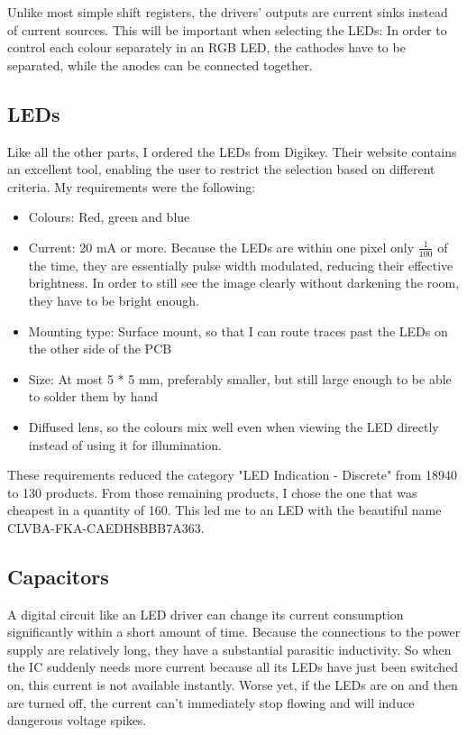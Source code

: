 \documentclass[a4paper, 11pt, titlepage]{report}
\begin{document}
Unlike most simple shift registers, the drivers' outputs are current sinks instead of current 
sources. This will be important when selecting the LEDs: In order to control each colour separately 
in an RGB LED, the cathodes have to be separated, while the anodes can be connected together.



\subsection{LEDs}

Like all the other parts, I ordered the LEDs from Digikey. Their website
contains an excellent tool, enabling the user to restrict the selection based on different criteria.
My requirements were the following:

\begin{itemize}

	\item Colours: Red, green and blue
	\item Current: 20 mA or more. Because the LEDs are within one pixel only $\frac{1}{100}$ of the
time, they are essentially pulse width modulated, reducing their effective brightness. In order to
still see the image clearly without darkening the room, they have to be bright enough.
	\item Mounting type: Surface mount, so that I can route traces past the LEDs on the other side 
of the PCB
	\item Size: At most 5 * 5 mm, preferably smaller, but still large enough to be able to solder them
by hand
	\item Diffused lens, so the colours mix well even when viewing the LED directly instead of using
it for illumination.

\end{itemize}

These requirements reduced the category "LED Indication - Discrete" from 18940 to 130 products.
From those remaining products, I chose the one that was cheapest in a quantity of 160. This 
led me to an LED with the beautiful name CLVBA-FKA-CAEDH8BBB7A363.



\subsection{Capacitors}

A digital circuit like an LED driver can change its current consumption significantly within a
short amount of time. Because the connections to the power supply are relatively long, they have 
a substantial parasitic inductivity. So when the IC suddenly needs more current because all its
LEDs have just been switched on, this current is not available instantly. Worse yet, if the LEDs
are on and then are turned off, the current can't immediately stop flowing and will induce
dangerous voltage spikes.
\end{document}

